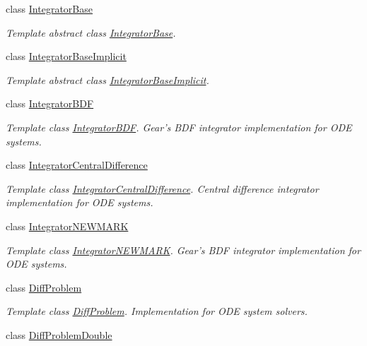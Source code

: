 \begin{DoxyCompactItemize}
class \hyperlink{classlmx_1_1IntegratorBase}{Integrator\-Base}
\begin{DoxyCompactList}\small\item\em Template abstract class \hyperlink{classlmx_1_1IntegratorBase}{Integrator\-Base}. \end{DoxyCompactList}\item 
class \hyperlink{classlmx_1_1IntegratorBaseImplicit}{Integrator\-Base\-Implicit}
\begin{DoxyCompactList}\small\item\em Template abstract class \hyperlink{classlmx_1_1IntegratorBaseImplicit}{Integrator\-Base\-Implicit}. \end{DoxyCompactList}\item 
class \hyperlink{classlmx_1_1IntegratorBDF}{Integrator\-B\-D\-F}
\begin{DoxyCompactList}\small\item\em Template class \hyperlink{classlmx_1_1IntegratorBDF}{Integrator\-B\-D\-F}. Gear's B\-D\-F integrator implementation for O\-D\-E systems. \end{DoxyCompactList}\item 
class \hyperlink{classlmx_1_1IntegratorCentralDifference}{Integrator\-Central\-Difference}
\begin{DoxyCompactList}\small\item\em Template class \hyperlink{classlmx_1_1IntegratorCentralDifference}{Integrator\-Central\-Difference}. Central difference integrator implementation for O\-D\-E systems. \end{DoxyCompactList}\item 
class \hyperlink{classlmx_1_1IntegratorNEWMARK}{Integrator\-N\-E\-W\-M\-A\-R\-K}
\begin{DoxyCompactList}\small\item\em Template class \hyperlink{classlmx_1_1IntegratorNEWMARK}{Integrator\-N\-E\-W\-M\-A\-R\-K}. Gear's B\-D\-F integrator implementation for O\-D\-E systems. \end{DoxyCompactList}\item 
class \hyperlink{classlmx_1_1DiffProblem}{Diff\-Problem}
\begin{DoxyCompactList}\small\item\em Template class \hyperlink{classlmx_1_1DiffProblem}{Diff\-Problem}. Implementation for O\-D\-E system solvers. \end{DoxyCompactList}\item 
class \hyperlink{classlmx_1_1DiffProblemDouble}{Diff\-Problem\-Double}

\end{DoxyCompactItemize}
